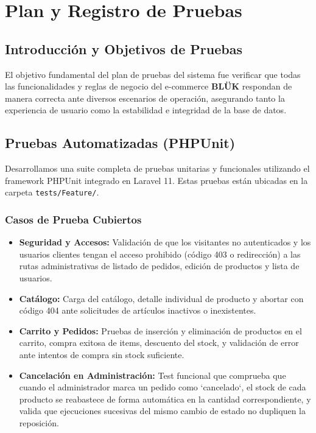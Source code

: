 \chapter{Plan y Registro de Pruebas}

\section{Introducción y Objetivos de Pruebas}
El objetivo fundamental del plan de pruebas del sistema fue verificar que todas las funcionalidades y reglas de negocio del e-commerce \textbf{BLÜK} respondan de manera correcta ante diversos escenarios de operación, asegurando tanto la experiencia de usuario como la estabilidad e integridad de la base de datos.

\section{Pruebas Automatizadas (PHPUnit)}
Desarrollamos una suite completa de pruebas unitarias y funcionales utilizando el framework PHPUnit integrado en Laravel 11. Estas pruebas están ubicadas en la carpeta \texttt{tests/Feature/}.

\subsection{Casos de Prueba Cubiertos}
\begin{itemize}
    \item \textbf{Seguridad y Accesos:} Validación de que los visitantes no autenticados y los usuarios clientes tengan el acceso prohibido (código 403 o redirección) a las rutas administrativas de listado de pedidos, edición de productos y lista de usuarios.
    \item \textbf{Catálogo:} Carga del catálogo, detalle individual de producto y abortar con código 404 ante solicitudes de artículos inactivos o inexistentes.
    \item \textbf{Carrito y Pedidos:} Pruebas de inserción y eliminación de productos en el carrito, compra exitosa de items, descuento del stock, y validación de error ante intentos de compra sin stock suficiente.
    \item \textbf{Cancelación en Administración:} Test funcional que comprueba que cuando el administrador marca un pedido como `cancelado`, el stock de cada producto se reabastece de forma automática en la cantidad correspondiente, y valida que ejecuciones sucesivas del mismo cambio de estado no dupliquen la reposición.
\end{itemize}

